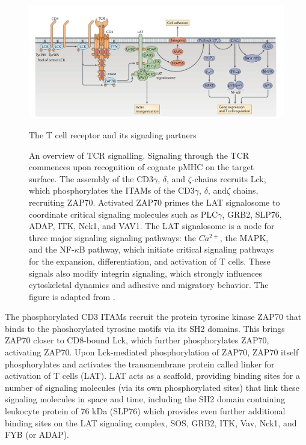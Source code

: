 \begin{figure}[htbp]
	\centering
	\includegraphics[width=\textwidth]{../figures/chapter1/tcrsignaling.png}
	\caption{The T cell receptor and its signaling partners}
	\caption*{An overview of TCR signalling.  Signaling through the TCR commences upon recognition of cognate pMHC on the target surface. The assembly of the CD3$\gamma$, $\delta$,  and $\zeta$-chains recruits Lck, which phosphorylates the ITAMs of the CD3$\gamma$, $\delta$,  and$\zeta$ chains, recruiting ZAP70.  Activated ZAP70 primes the LAT signalosome to coordinate critical signaling molecules such as PLC$\gamma$, GRB2, SLP76, ADAP, ITK, Nck1, and VAV1.  The LAT signalosome is a node for three major signaling signaling pathways: the $Ca^{2+}$, the MAPK, and the NF-$\kappa$B pathway, which initiate critical signaling pathways for the expansion, differentiation, and activation of T cells. These signals also modify integrin signaling, which strongly influences cytoskeletal dynamics and adhesive and migratory behavior.  The figure is adapted from \cite{Brownlie2013}.}
	\label{fig:tcrsignaling}
\end{figure}

The phosphorylated CD3 ITAMs recruit the protein tyrosine kinase ZAP70 that binds to the phoshorylated tyrosine motifs via its SH2 domains.  This brings ZAP70 closer to CD8-bound Lck, which further phosphorylates ZAP70, activating ZAP70. Upon Lck-mediated phosphorylation of ZAP70,  ZAP70 itself phosphorylates and activates the transmembrane protein called linker for activation of T cells (LAT). LAT acts as a scaffold, providing binding sites for a number of signaling molecules (via its own phosphorylated sites) that link these signaling molecules in space and time, including the SH2 domain containing leukocyte protein of 76 kDa (SLP76) which provides even further additional binding sites on the LAT signaling complex, SOS,  GRB2, ITK, Vav, Nck1, and FYB (or ADAP).

